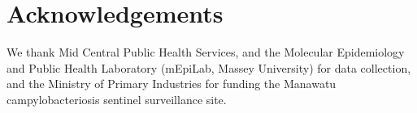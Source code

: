 \documentclass[AMA,STIX1COL]{WileyNJD-v2}
\begin{document}
\section*{Acknowledgements}

We thank Mid Central Public Health Services, and the Molecular Epidemiology and Public Health Laboratory (mEpiLab, Massey University) for data collection, and the Ministry of Primary Industries for funding the Manawatu campylobacteriosis sentinel surveillance site.


\end{document}
